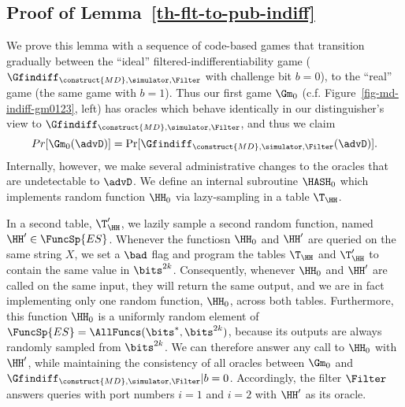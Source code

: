 \subsection{Proof of Lemma~\ref{th-flt-to-pub-indiff}}
	We prove this lemma with a sequence of code-based games that transition gradually between the ``ideal'' filtered-indifferentiability game ($\Gfindiff_{\construct{MD}, \simulator, \Filter}$ with challenge bit $b=0$), to the ``real'' game (the same game with $b=1$).
	Thus our first game $\Gm_0$ (c.f. Figure~\ref{fig-md-indiff-gm0123}, left) has oracles which behave identically in our distinguisher's view to $\Gfindiff_{\construct{MD}, \simulator, \Filter}$, and thus we claim
	\[Pr[\Gm_0(\advD)] = \Pr[\Gfindiff_{\construct{MD},  \simulator, \Filter}(\advD)].\]
	Internally, however, we make several administrative changes to the oracles that are undetectable to $\advD$.
	We define an internal subroutine $\HASH_0$ which implements random function $\HH_0$ via lazy-sampling in a table $\T_\HH$.
	
	In a second table, $\T_{\HH}^{\prime}$, we lazily sample a second random function, named $\HH^{\prime}\in\FuncSp{ES}$.
	Whenever the functiosn $\HH_0$ and $\HH^{\prime}$ are queried on the same string $X$, we set a $\bad$ flag and program the tables $\T_ {\HH}$ and $\T_{\HH}^{\prime}$ to contain the same value in $\bits^{2k}$.
	Consequently, whenever $\HH_0$ and $\HH^{\prime}$ are called on the same input, they will return the same output, and we are in fact implementing only one random function, $\HH_0$, across both tables.
	Furthermore, this function $\HH_0$ is a uniformly random element of $\FuncSp{ES} = \AllFuncs(\bits^*, \bits^{2k})$, because its outputs are always randomly sampled from $\bits^{2k}$.
	We can therefore answer any call to $\HH_0$ with $\HH^{\prime}$, while maintaining the consistency of all oracles between $\Gm_0$ and $\Gfindiff_{\construct{MD}, \simulator, \Filter} | b= 0$.
	Accordingly, the filter $\Filter$ answers queries with port numbers $i=1$ and $i=2$ with $\HH^{\prime}$ as its oracle.
	
